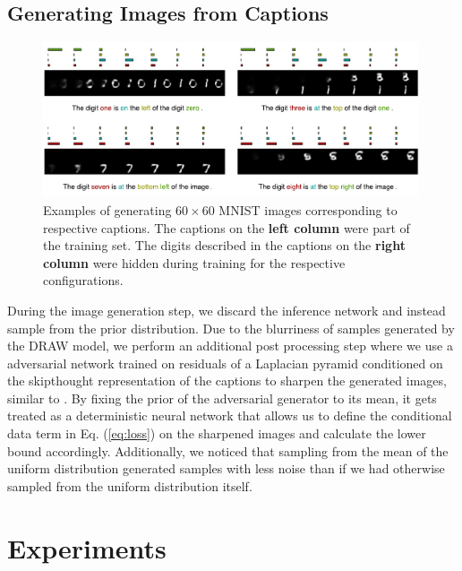 \documentclass{article} %
\begin{document}
\subsection{Generating Images from Captions}

\begin{figure}[!t]
\captionsetup[subfigure]{labelformat=empty}
\begin{center}
\includegraphics[width=0.99\textwidth]{figures/new/mnist/test3.pdf}\quad
%
\end{center}
\caption{Examples of generating $60 \times 60$ MNIST images corresponding to respective captions. The captions on the \textbf{left column} were part of the training set. The digits described in the captions on the \textbf{right column} were hidden during training for the respective configurations.}
\label{fig:figmnist}
\vspace{-0.3cm}
\end{figure}

During the image generation step, we discard the inference network and instead sample from the prior distribution. 
Due to the blurriness of samples generated by the DRAW model, we perform an additional post processing step where we use a 
adversarial network trained on residuals of a Laplacian pyramid conditioned on the skipthought representation \citep{kiros_skipthought} of the captions 
to sharpen the generated images, similar to \citep{denton_lapgan}. By fixing the prior of the adversarial generator to its mean, it gets treated as a deterministic neural network that allows us to define the conditional data term in Eq. (\ref{eq:loss}) on the sharpened images and calculate the lower bound accordingly. Additionally, we noticed that sampling from the mean of the uniform distribution generated samples with less noise than if we had otherwise sampled from the uniform distribution itself.  

\section{Experiments}
\end{document}
